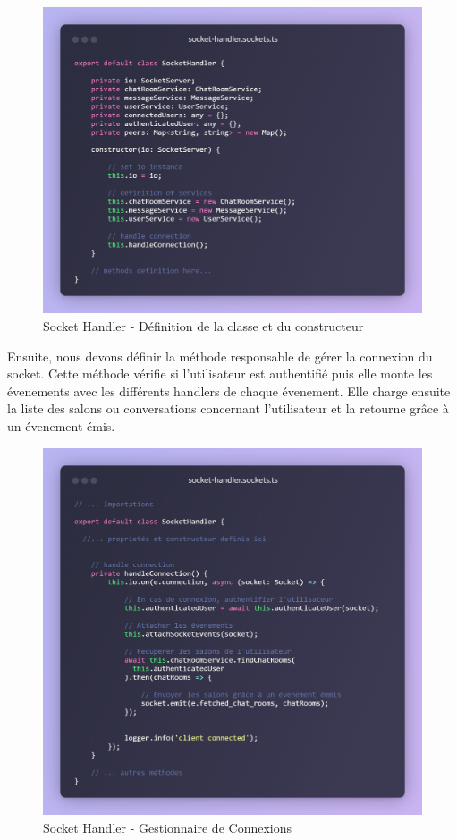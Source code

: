 \begin{figure}[H]
    \centering
    \includegraphics[width=16cm]{assets/annexes/snippet (4).png}
    \caption{Socket Handler - Définition de la classe et du constructeur}
\end{figure}

\vspace{1cm}

Ensuite, nous devons définir la méthode responsable de gérer la connexion du socket. Cette méthode vérifie si l'utilisateur est authentifié puis elle monte les évenements avec les différents handlers de chaque évenement. 
Elle charge ensuite la liste des salons ou conversations concernant l'utilisateur et la retourne grâce à un évenement émis.

\begin{figure}[H]
    \centering
    \includegraphics[width=16cm]{assets/annexes/snippet (5).png}
    \caption{Socket Handler - Gestionnaire de Connexions}
\end{figure}

